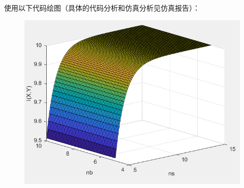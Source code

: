 \documentclass[12pt]{article}
\begin{document}
使用以下代码绘图（具体的代码分析和仿真分析见仿真报告）：

\begin{figure}[htp]
    \centering
    \includegraphics[width=12.5cm]{Image_of_Q2RERE.png}
\end{figure}
\newpage
\end{document}
